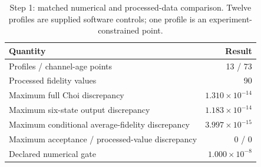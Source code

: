 \begin{table}[htbp]\centering\small\begin{tabular}{p{.62\linewidth}r}\toprule Quantity & Result\\\midrule
Profiles / channel-age points & 13 / 73\\
Processed fidelity values & 90\\
Maximum full Choi discrepancy & $1.310\times10^{-14}$\\
Maximum six-state output discrepancy & $1.183\times10^{-14}$\\
Maximum conditional average-fidelity discrepancy & $3.997\times10^{-15}$\\
Maximum acceptance / processed-value discrepancy & $0$ / $0$\\
Declared numerical gate & $1.000\times10^{-8}$\\\bottomrule\end{tabular}\caption{Step 1: matched numerical and processed-data comparison. Twelve profiles are supplied software controls; one profile is an experiment-constrained point.}\label{tab:systemcomparison}\end{table}
